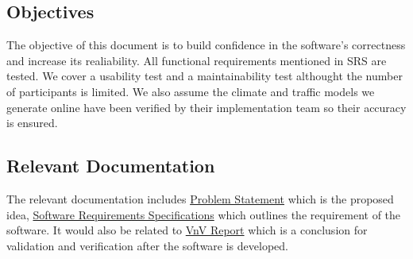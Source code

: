 \documentclass[12pt, titlepage]{article}
\begin{document}
\subsection{Objectives}
The objective of this document is to build confidence in the software's correctness and increase its realiability. All functional requirements mentioned in SRS are tested. We cover a usability test and a maintainability test althought the number of participants is limited. We also assume the climate and traffic models we generate online have been verified by their implementation team so their accuracy is ensured. 





\subsection{Relevant Documentation}
The relevant documentation includes \href{https://github.com/CynthiaLiu0805/BridgeCorrosion/blob/main/docs/ProblemStatementAndGoals/ProblemStatement.pdf}{Problem Statement} which is the proposed idea, \href{https://github.com/CynthiaLiu0805/BridgeCorrosion/blob/main/docs/SRS/SRS.pdf}{Software Requirements Specifications} which outlines the requirement of the software. It would also be related to \href{https://github.com/CynthiaLiu0805/BridgeCorrosion/blob/main/docs/VnVReport/VnVReport.pdf}{VnV Report} which is a conclusion for validation and verification after the software is developed.
\end{document}
